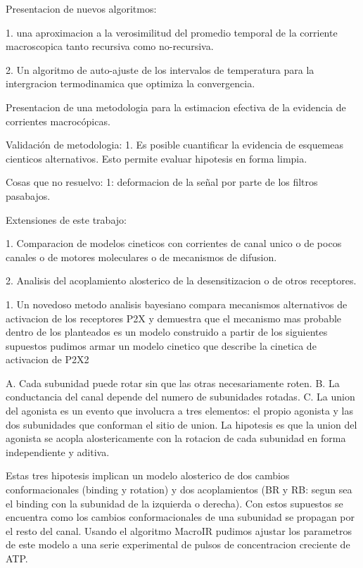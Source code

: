 \documentclass[a4paper,12pt]{article}
\begin{document}
		Presentacion de nuevos algoritmos:
		
		1. una aproximacion a la verosimilitud del promedio temporal de la corriente macroscopica tanto recursiva como no-recursiva. 
		
		2. Un algoritmo de auto-ajuste de los intervalos de temperatura para la intergracion termodinamica que optimiza la convergencia. 
		
		Presentacion de una metodologia para la estimacion efectiva de la evidencia de corrientes macrocópicas. 
		
		
		Validación de metodologia: 
		1. Es posible cuantificar la evidencia de esquemeas cienticos alternativos. Esto permite evaluar hipotesis en forma limpia. 
		
		Cosas que no resuelvo: 
		1: deformacion de la señal por parte de los filtros pasabajos. 
		
		Extensiones de este trabajo: 
		
		1. Comparacion de  modelos cineticos con corrientes de canal unico o de pocos canales o de motores moleculares o de mecanismos de difusion. 
		
		2. Analisis del acoplamiento alosterico de la desensitizacion o de otros receptores. 
		
		
		1. Un novedoso metodo analisis bayesiano compara mecanismos alternativos de activacion de los receptores P2X y demuestra que el mecanismo mas probable dentro de los planteados es un modelo construido a partir de los siguientes supuestos pudimos armar un modelo cinetico que describe la cinetica de activacion de P2X2 
		
		A. Cada subunidad puede rotar sin que las otras necesariamente roten. 
		B. La conductancia del canal depende del numero de subunidades rotadas. 
		C. La union del agonista es un evento que involucra a tres elementos: el propio agonista y las dos subunidades que conforman el sitio de union. La hipotesis es que la union del agonista se acopla alostericamente con la rotacion de cada subunidad en forma independiente y aditiva. 
		
		Estas tres hipotesis implican un modelo alosterico de dos cambios conformacionales (binding y rotation) y dos acoplamientos (BR y RB: segun sea el binding con la subunidad de la izquierda o derecha). 
		Con estos supuestos se encuentra como los cambios conformacionales de una subunidad se propagan por el resto del canal. 
		Usando el algoritmo MacroIR pudimos ajustar los parametros de este modelo a una serie experimental de pulsos de concentracion creciente de ATP. 
		
\end{document}
